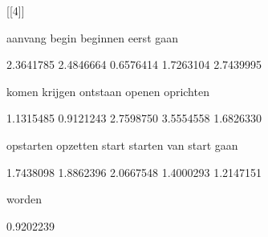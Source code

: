 [[4]]



       aanvang          begin       beginnen          eerst           gaan 



     2.3641785      2.4846664      0.6576414      1.7263104      2.7439995 



         komen        krijgen       ontstaan         openen      oprichten 



     1.1315485      0.9121243      2.7598750      3.5554558      1.6826330 



     opstarten       opzetten          start        starten van start gaan 



     1.7438098      1.8862396      2.0667548      1.4000293      1.2147151 



        worden 



     0.9202239 
